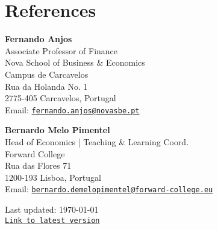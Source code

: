 \documentclass[letterpaper]{article}
\def\footerlink{https://miguelcfoliveira.github.io/CV/CV.pdf}
\begin{document}
\section*{References}
\begin{multicols}{2}
\textbf{Fernando Anjos} \\
Associate Professor of Finance \\
Nova School of Business \& Economics \\
Campus de Carcavelos \\
Rua da Holanda No. 1 \\ 
2775-405 Carcavelos, Portugal \\ 
Email: \href{mailto:fernando.anjos@novasbe.pt}{\tt fernando.anjos@novasbe.pt} 
\columnbreak \hfill

\textbf{Bernardo Melo Pimentel} \\
Head of Economics | Teaching \& Learning Coord. \\
Forward College \\
Rua das Flores 71 \\
1200-193 Lisboa, Portugal \\
Email: \href{mailto:bernardo.demelopimentel@forward-college.eu}{\tt bernardo.demelopimentel@forward-college.eu} 
\end{multicols}


\bigskip

\begin{center}
  \begin{footnotesize}
    Last updated: \today \\
    \href{\footerlink}{\texttt{Link to latest version}}
  \end{footnotesize}
\end{center}
\end{document}
